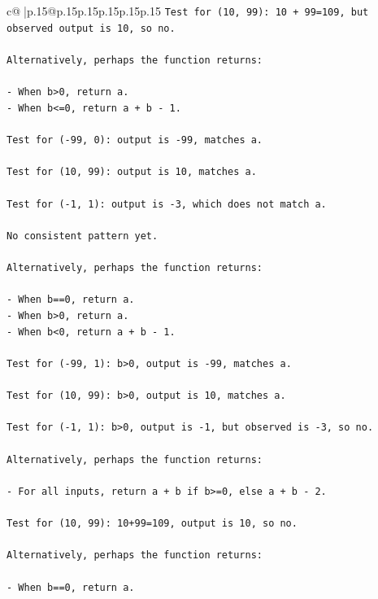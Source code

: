 \documentclass{article}
\begin{document}
{\begin{supertabular}{c@{$\;$}|p{.15\linewidth}@{}p{.15\linewidth}p{.15\linewidth}p{.15\linewidth}p{.15\linewidth}p{.15\linewidth}}
{{{\texttt{Test for (10, 99): 10 + 99=109, but observed output is 10, so no.} \\
\\ 
\texttt{Alternatively, perhaps the function returns:} \\
\\ 
\texttt{{-} When b>0, return a.} \\
\texttt{{-} When b<=0, return a + b {-} 1.} \\
\\ 
\texttt{Test for ({-}99, 0): output is {-}99, matches a.} \\
\\ 
\texttt{Test for (10, 99): output is 10, matches a.} \\
\\ 
\texttt{Test for ({-}1, 1): output is {-}3, which does not match a.} \\
\\ 
\texttt{No consistent pattern yet.} \\
\\ 
\texttt{Alternatively, perhaps the function returns:} \\
\\ 
\texttt{{-} When b==0, return a.} \\
\texttt{{-} When b>0, return a.} \\
\texttt{{-} When b<0, return a + b {-} 1.} \\
\\ 
\texttt{Test for ({-}99, 1): b>0, output is {-}99, matches a.} \\
\\ 
\texttt{Test for (10, 99): b>0, output is 10, matches a.} \\
\\ 
\texttt{Test for ({-}1, 1): b>0, output is {-}1, but observed is {-}3, so no.} \\
\\ 
\texttt{Alternatively, perhaps the function returns:} \\
\\ 
\texttt{{-} For all inputs, return a + b if b>=0, else a + b {-} 2.} \\
\\ 
\texttt{Test for (10, 99): 10+99=109, output is 10, so no.} \\
\\ 
\texttt{Alternatively, perhaps the function returns:} \\
\\ 
\texttt{{-} When b==0, return a.} \\
}}}
\end{supertabular}}
\end{document}
